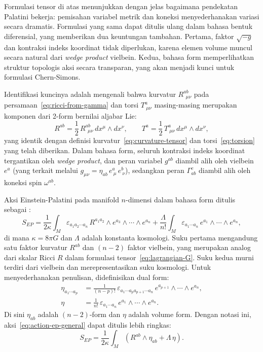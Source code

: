 Formulasi tensor di atas menunjukkan dengan jelas bagaimana pendekatan Palatini bekerja: pemisahan variabel metrik dan koneksi menyederhanakan variasi secara dramatis. Formulasi yang sama dapat ditulis ulang dalam bahasa bentuk diferensial, yang memberikan dua keuntungan tambahan. Pertama, faktor $\sqrt{-g}$ dan kontraksi indeks koordinat tidak diperlukan, karena elemen volume muncul secara natural dari \textit{wedge product} vielbein. Kedua, bahasa form memperlihatkan struktur topologis aksi secara transparan, yang akan menjadi kunci untuk formulasi Chern-Simons.

Identifikasi kuncinya adalah mengenali bahwa kurvatur $R^{ab}_{\ \ \mu\nu}$ pada persamaan~\eqref{eq:ricci-from-gamma} dan torsi $T^a_{\ \mu\nu}$ masing-masing merupakan komponen dari 2-form bernilai aljabar Lie:
\begin{equation}
    R^{ab} = \frac{1}{2}\, R^{ab}_{\ \ \mu\nu}\, dx^\mu \wedge dx^\nu, \qquad T^a = \frac{1}{2}\, T^a_{\ \mu\nu}\, dx^\mu \wedge dx^\nu,
\end{equation}
yang identik dengan definisi kurvatur~\eqref{eq:curvature-tensor} dan torsi~\eqref{eq:torsion} yang telah diberikan. Dalam bahasa form, seluruh kontraksi indeks koordinat tergantikan oleh \textit{wedge product}, dan peran variabel $g^{ab}$ diambil alih oleh vielbein $e^a$ (yang terkait melalui $g_{\mu\nu} = \eta_{ab}\, e^a_{\ \mu}\, e^b_{\ \nu}$), sedangkan peran $\Gamma^c_{ab}$ diambil alih oleh koneksi spin $\omega^{ab}$.

Aksi Einstein-Palatini pada manifold $n$-dimensi dalam bahasa form ditulis sebagai \cite{zanelli2005lecture}:
\begin{equation}\label{eq:action-ep-general}
    S_{EP} = \frac{1}{2\kappa}\int_M \varepsilon_{a_1 a_2 \cdots a_n}\, R^{a_1 a_2} \wedge e^{a_3} \wedge \cdots \wedge e^{a_n} + \frac{\Lambda}{n!}\int_M \varepsilon_{a_1 \cdots a_n}\, e^{a_1} \wedge \cdots \wedge e^{a_n},
\end{equation}
di mana $\kappa = 8\pi G$ dan $\Lambda$ adalah konstanta kosmologi. Suku pertama mengandung satu faktor kurvatur $R^{ab}$ dan $(n-2)$ faktor vielbein, yang merupakan analog dari skalar Ricci $R$ dalam formulasi tensor~\eqref{eq:lagrangian-G}. Suku kedua murni terdiri dari vielbein dan merepresentasikan suku kosmologi. Untuk menyederhanakan penulisan, didefinisikan dual form:
\begin{align}
    \eta_{a_1 \cdots a_p} &= \frac{1}{(n-p)!}\,\varepsilon_{a_1 \cdots a_p a_{p+1} \cdots a_n}\, e^{a_{p+1}} \wedge \cdots \wedge e^{a_n}, \label{eq:dual-form-general}\\
    \eta &= \frac{1}{n!}\,\varepsilon_{a_1 \cdots a_n}\, e^{a_1} \wedge \cdots \wedge e^{a_n}. \label{eq:vol-form-general}
\end{align}
Di sini $\eta_{ab}$ adalah $(n-2)$-form dan $\eta$ adalah volume form. Dengan notasi ini, aksi~\eqref{eq:action-ep-general} dapat ditulis lebih ringkas:
\begin{equation}\label{eq:action-ep-compact-general}
    S_{EP} = \frac{1}{2\kappa}\int_M \left(R^{ab} \wedge \eta_{ab} + \Lambda\, \eta\right).
\end{equation}

